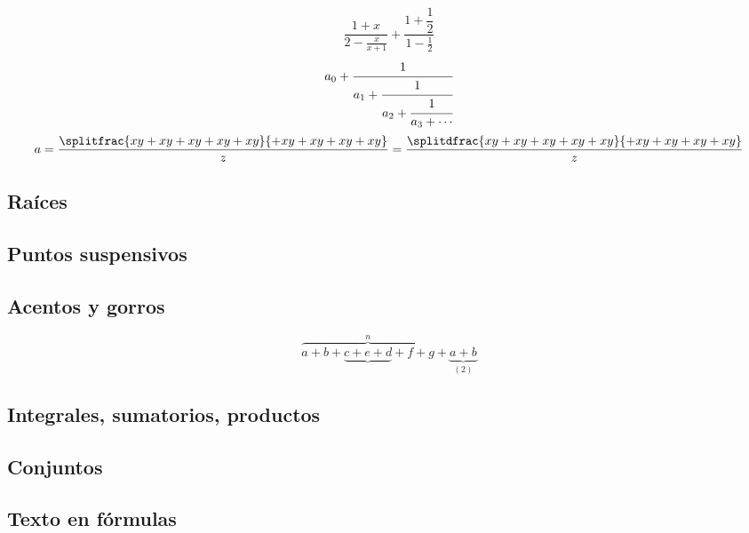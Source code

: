 \documentclass{article}
\numberwithin{equation}{section}
\theoremstyle{plain}
\theoremstyle{definition}
\theoremstyle{remark}
\begin{document}


\[
\frac{1+x}{2-\frac{x}{x+1}} + \frac{1+\dfrac{1}{2}}{1-\frac{1}{2}}
\]
\[
  a_0+\cfrac{1}{a_1+\cfrac{1}{a_2+\cfrac{1}{a_3+\cdots}}}
\]    
\[ a=\frac{
          \splitfrac{xy + xy + xy + xy + xy}
                    {+ xy + xy + xy + xy}
}
{z} =\frac{
          \splitdfrac{xy + xy + xy + xy + xy}
                    {+ xy + xy + xy + xy}
    }{z} 
\]



\subsection{Raíces}



\subsection{Puntos suspensivos}



\subsection{Acentos y gorros}




\[
\overbrace{a+b+\underbrace{c+e+d}+f+g}^{n}+\underbrace{a+b}_{(2)}
\]

\subsection{Integrales, sumatorios, productos}


\subsection{Conjuntos}


\subsection{Texto en fórmulas}

\end{document}

